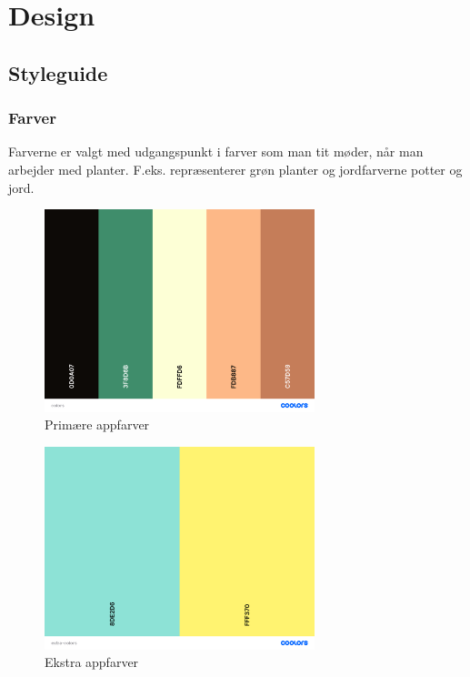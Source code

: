 \newpage
\section{Design}

\subsection{Styleguide}

\subsubsection*{Farver}

Farverne er valgt med udgangspunkt i farver som man tit møder, når man arbejder med planter. F.eks. repræsenterer grøn planter og jordfarverne potter og jord.

\begin{figure}[H]
    \label{farveskema}
    \centering
    \includegraphics[width=0.7\textwidth]{img/colors.png}
    \caption{Primære appfarver}
\end{figure}

\begin{figure}[H]
    \label{farveskema}
    \centering
    \includegraphics[width=0.7\textwidth]{img/extra-colors.png}
    \caption{Ekstra appfarver}
\end{figure}


